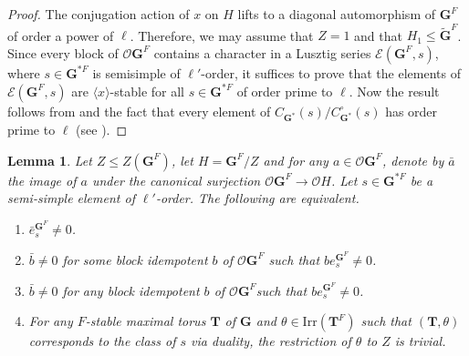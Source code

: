 \documentclass{amsart}
\theoremstyle{plain}\newtheorem{Theorem}{Theorem}[section]
\theoremstyle{plain}\newtheorem{Conjecture}[Theorem]{Conjecture}
\theoremstyle{plain}\newtheorem{Corollary}[Theorem]{Corollary}
\theoremstyle{plain}\newtheorem{Lemma}[Theorem]{Lemma}
\theoremstyle{plain}\newtheorem{Proposition}[Theorem]{Proposition}
\theoremstyle{definition}\newtheorem{Definition}[Theorem]{Definition}
\theoremstyle{definition}\newtheorem{Example}[Theorem]{Example}
\theoremstyle{definition}\newtheorem{Examples}[Theorem]{Examples}
\theoremstyle{definition}\newtheorem{Exercise}[Theorem]{Exercise}
\theoremstyle{definition}\newtheorem{Notation}[Theorem]{Notation}
\theoremstyle{definition}\newtheorem{Remark}[Theorem]{Remark}
\theoremstyle{definition}\newtheorem{Remarks}[Theorem]{Remarks}
\def\CE{{\mathcal{E}}}  \def\OR{{\mathcal{O}R}}
\def\CO{{\mathcal{O}}}    \def\OPE{{\mathcal{O}(P\rtimes E)}}
\def\Irr{\mathrm{Irr}}           \def\tenK{\otimes_K}
\newcommand{\bG}{{\mathbf{G}}}
\newcommand{\bT}{{\mathbf{T}}}
\numberwithin{equation}{section}
\begin{document}
\begin{proof}  The conjugation action  of  $x$ on $H$  lifts to a diagonal automorphism of  $\bG^F$ of order a power of $\ell$. Therefore, we may assume that $Z=1$ and  that $H_1 \leq \tilde \bG^F$. Since every  block of $\CO \bG^F$ contains a character in  a Lusztig series $\CE (\bG^{F}, s )$, where $ s \in \bG^{*F}$ is  semisimple of $\ell'$-order,  it suffices to  prove that  the elements of $\CE (\bG^{F}, s )$ are $\langle x \rangle $-stable  for all $s \in \bG^{*F} $ of order prime to $\ell$.    Now the result follows from \cite[Cor. 11.13]{Bon06} and the fact that every element of  
$C_{\bG^*}(s)/C_{\bG^*}^{\circ} (s)$   has  order prime to $\ell$ (see \cite[Rem.~11.2.2]{DiMi}).
    \end{proof}
    
    \begin{Lemma} \label{lem: centralkerne}  Let $ Z\leq Z(\bG^F)$, let $H = \bG^F/Z $  and  for any $a \in \CO \bG^F $, denote by $\bar a $ the image of $a$  under the canonical surjection $\CO \bG^F \to \CO  H $. Let  $s\in  \bG^{*F}$ be a semi-simple element of $\ell'$-order. The following are equivalent.

\begin{enumerate}
\item [(i)]  $\bar e_s^{\bG^F}  \ne 0 $.
\item  [(ii)] $\bar b   \ne 0 $ for some   block idempotent $b$ of $\CO \bG^F$ such that  $b e_s^{\bG^F} \ne 0$.
\item [(iii)] $\bar b   \ne 0 $  for any  block idempotent $b$  of $\CO \bG^F$such that  $b e_s^{\bG^F} \ne 0$.
\item [(iv)]   For any  $F$-stable maximal torus  $\bT$ of $\bG$ and $\theta \in \Irr (\bT^F)$ such that  $(\bT, \theta) $  corresponds to the  class of $s$ via duality,  the restriction of $\theta $ to $Z$ is trivial.
\end{enumerate}
\end{Lemma}
\end{document}
